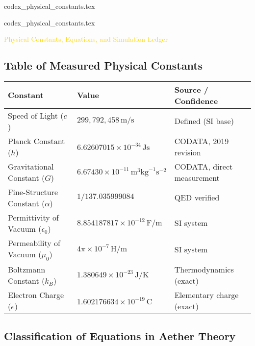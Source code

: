 codex_physical_constants.tex

codex_physical_constants.tex

\textcolor{gold}{ Physical Constants, Equations, and Simulation Ledger }

\subsection{Table of Measured Physical Constants}

\begin{center}
    \begin{tabular}{|l|l|l|}
        \hline
        \textbf{Constant} & \textbf{Value} & \textbf{Source / Confidence} \\
        \hline
        Speed of Light (\(c\)) & \(299,792,458 \, \mathrm{m/s}\) & Defined (SI base) \\
        \hline
        Planck Constant (\(h\)) & \(6.62607015 \times 10^{-34} \, \mathrm{Js}\) & CODATA, 2019 revision \\
        \hline
        Gravitational Constant (\(G\)) & \(6.67430 \times 10^{-11} \, \mathrm{m}^3 \mathrm{kg}^{-1} \mathrm{s}^{-2}\) & CODATA, direct measurement \\
        \hline
        Fine-Structure Constant (\(\alpha\)) & \(1 / 137.035999084\) & QED verified \\
        \hline
        Permittivity of Vacuum (\(\epsilon_0\)) & \(8.854187817 \times 10^{-12} \, \mathrm{F/m}\) & SI system \\
        \hline
        Permeability of Vacuum (\(\mu_0\)) & \(4 \pi \times 10^{-7} \, \mathrm{H/m}\) & SI system \\
        \hline
        Boltzmann Constant (\(k_B\)) & \(1.380649 \times 10^{-23} \, \mathrm{J/K}\) & Thermodynamics (exact) \\
        \hline
        Electron Charge (\(e\)) & \(1.602176634 \times 10^{-19} \, \mathrm{C}\) & Elementary charge (exact) \\
        \hline
    \end{tabular}
\end{center}

\subsection{Classification of Equations in Aether Theory}

